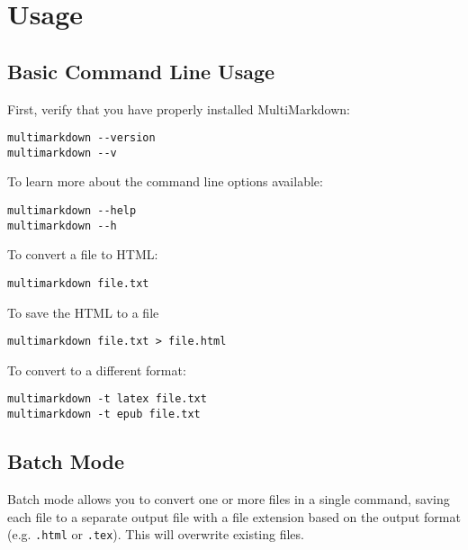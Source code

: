 
\def\mytitle{MultiMarkdown Usage}
\def\myauthor{Fletcher T. Penney}
\def\revised{2018-10-09}




\tableofcontents

\chapter{Usage}
\label{usage}

\section{Basic Command Line Usage}
\label{basiccommandlineusage}

First, verify that you have properly installed MultiMarkdown:

\begin{verbatim}
multimarkdown --version
multimarkdown --v
\end{verbatim}

To learn more about the command line options available:

\begin{verbatim}
multimarkdown --help
multimarkdown --h
\end{verbatim}

To convert a file to HTML:

\begin{verbatim}
multimarkdown file.txt
\end{verbatim}

To save the HTML to a file

\begin{verbatim}
multimarkdown file.txt > file.html
\end{verbatim}

To convert to a different format:

\begin{verbatim}
multimarkdown -t latex file.txt
multimarkdown -t epub file.txt
\end{verbatim}

\section{Batch Mode}
\label{batchmode}

Batch mode allows you to convert one or more files in a single command, saving each file to a separate output file with a file extension based on the output format (e.g. \texttt{.html} or \texttt{.tex}). This will overwrite existing files.

